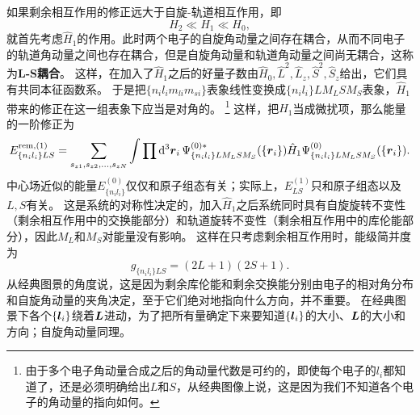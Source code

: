 \documentclass[UTF8, a4paper]{ctexart}
\begin{document}
如果剩余相互作用的修正远大于自旋-轨道相互作用，即
\begin{equation}
    H_2 \ll H_1 \ll H_0,
\end{equation}
就首先考虑$\hat{H}_1$的作用。此时两个电子的自旋角动量之间存在耦合，从而不同电子的轨道角动量之间也存在耦合，但是自旋角动量和轨道角动量之间尚无耦合，这称为\textbf{L-S耦合}。
这样，在加入了$\hat{H}_1$之后的好量子数由$\hat{H}_0, \hat{L}^2, \hat{L}_z, \hat{S}^2, \hat{S}_z$给出，它们具有共同本征函数系。
于是把$\{n_i l_i m_{li} m_{si}\}$表象线性变换成$\{n_i l_i\} L M_L S M_S$表象，$\hat{H}_1$带来的修正在这一组表象下应当是对角的。%
\footnote{由于多个电子角动量合成之后的角动量代数是可约的，即使每个电子的$l_i$都知道了，还是必须明确给出$L$和$S$，从经典图像上说，这是因为我们不知道各个电子的角动量的指向如何。}%
这样，把$\hat{H}_1$当成微扰项，那么能量的一阶修正为
\begin{equation}
    E^{\text{rem}, (1)}_{\{n_i l_i\} LS} = \sum_{s_{z1}, s_{z2}, \ldots, s_{zN}} \int \prod \dd[3]{\vb*{r}_i} \Psi^{(0) *}_{\{n_i l_i\} L M_L S M_S}(\{\vb*{r}_i\}) \hat{H}_1 \Psi^{(0)}_{\{n_i l_i\} L M_L S M_S}(\{\vb*{r}_i\}).
    \label{eq:ls-1}
\end{equation}
中心场近似的能量$E^{(0)}_{\{n_i l_i\}}$仅仅和原子组态有关；实际上，$E^{(1)}_{LS}$只和原子组态以及$L,S$有关。
这是系统的对称性决定的，加入$\hat{H}_1$之后系统同时具有自旋旋转不变性（剩余相互作用中的交换能部分）和轨道旋转不变性（剩余相互作用中的库伦能部分），因此$M_L$和$M_S$对能量没有影响。
这样在只考虑剩余相互作用时，能级简并度为
\begin{equation}
    g_{\{n_i l_i\}LS} = (2L+1)(2S+1).
\end{equation}
从经典图景的角度说，这是因为剩余库伦能和剩余交换能分别由电子的相对角分布和自旋角动量的夹角决定，至于它们绝对地指向什么方向，并不重要。
在经典图景下各个$\{\vb*{l}_i\}$绕着$\vb*{L}$进动，为了把所有量确定下来要知道$\{\vb*{l}_i\}$的大小、$\vb*{L}$的大小和方向；自旋角动量同理。
\end{document}
